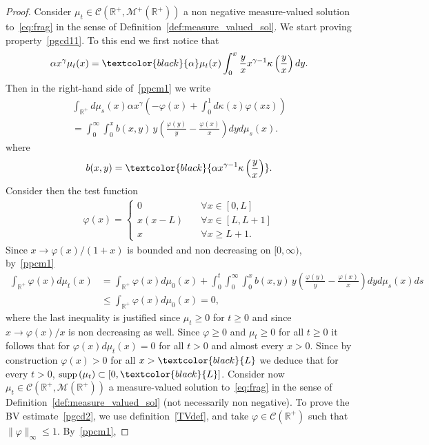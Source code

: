 \documentclass[AHL,Unicode,longabstracts,published]{cedram}
\newcommand*\dst{\displaystyle}
\newcommand*\R{\mathbb{R}}
\newcommand*\M{\mathcal{M}}
\newcommand{\clC}{\mathcal{C}}
\newcommand{\MT}[1]{\textcolor{black}{#1}}
\newcommand*\supp{{\mbox{\small\rm supp}}\,}
\let\oldforall\forall
\renewcommand*{\forall}{\mathrel{\oldforall}}
\begin{document}
\begin{proof}
Consider $\mu_t \in \clC(\R^+,\M^+(\R^+))$ a non negative measure-valued solution to~\eqref{eq:frag} in the sense of Definition~\eqref{def:measure_valued_sol}. We start proving property~\eqref{pgcd11}. To this end we first notice that
\begin{align*}
\alpha x^\gamma \mu _t(x)=\MT{\alpha}\mu _t(x)\int _0^x\frac {y} {x}x^{\gamma -1}\kappa \left(\frac {y} {x}\right)dy.
\end{align*}
Then in the right-hand side of~\eqref{ppcm1} we write
\begin{multline*}
\int_{\R^+} d\mu_s(x) \alpha x^{\gamma}\left(- \varphi(x) + \dst\int_{0}^{1} d\kappa(z)\varphi(xz)\right)\\
=\int _0^\infty\int _0^x b(x, y)\, y\left(\frac {\varphi (y)} {y}- \frac {\varphi (x)} {x}\right)dyd\mu _s(x).
\end{multline*}
where
\begin{align}\label{bxy}
b(x,y)=\MT{\alpha x^{\gamma-1}\kappa \left(
\frac{y}{x}\right)}.
\end{align}
Consider then the test function
\begin{align*}
\varphi (x)=
\begin{cases}
0 &\forall x\in [0, L]\\
x(x-L)\quad &\forall x\in [L, L+1]\\
x &\forall x\ge L+1.
\end{cases}
\end{align*}
Since $x\to \varphi (x)/(1+x)$ is bounded and non decreasing on $[0, \infty)$, by~\eqref{ppcm1}
\begin{align*}
\int_{\R^+} \varphi(x) d\mu_t(x)&= \int_{\R^+}
\varphi(x) d\mu_0(x) + \int_0^t \int _0^\infty\int _0^x b(x, y)\, y\left(\frac {\varphi (y)} {y}- \frac {\varphi (x)} {x}\right)dyd\mu _s(x) ds\\
& \le \int_{\R^+} \varphi(x) d\mu_0(x) =0,
\end{align*}
where the last inequality is justified since $\mu_t\geq 0$ for $t\geq 0$ and since $x\to \varphi(x)/x$ is non decreasing as well. Since $\varphi\ge 0$ and $ \mu _t\ge 0$ for all $t\ge 0$ it follows that for $\varphi (x)d\mu _t(x)=0$ for all $t>0$ and almost every $x>0$. Since by construction $\varphi (x)>0$ for all $x>\MT{L}$ we deduce that for every $t>0$, $\supp (\mu _t)\subset [0, \MT{L}]$.
Consider now $\mu_t \in \clC(\R^+,\M(\R^+))$ a measure-valued solution to~\eqref{eq:frag} in the sense of Definition~\eqref{def:measure_valued_sol} (not necessarily non negative). To prove the BV estimate~\eqref{pgcd2}, we use definition~\eqref{TVdef}, and take $\varphi \in \clC(\R^+)$ such that $\|\varphi\|_{\infty} \leq 1$. By~\eqref{ppcm1},

\end{proof}
\end{document}
